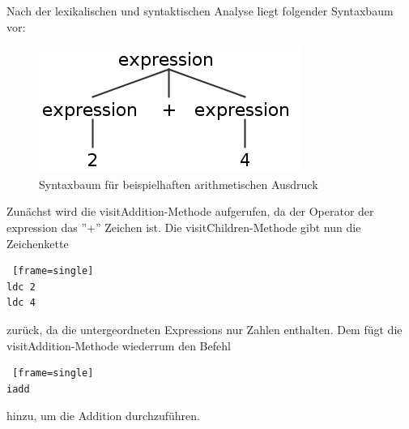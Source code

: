 \pagebreak
Nach der lexikalischen und syntaktischen Analyse liegt folgender Syntaxbaum vor:

\begin{figure}[h!]
\centering
\includegraphics[scale=0.4]{pics/antlr4_parse_tree_visitAdditionVisitNumberBeispiel.png}
\caption{Syntaxbaum für beispielhaften arithmetischen Ausdruck}
\end{figure}

Zunächst wird die visitAddition-Methode aufgerufen, da der Operator der expression das ''+'' Zeichen ist. Die visitChildren-Methode gibt nun die Zeichenkette
\begin{lstlisting} [frame=single]
ldc 2
ldc 4
\end{lstlisting}
zurück, da die untergeordneten Expressions nur Zahlen enthalten. Dem fügt die visitAddition-Methode wiederrum den Befehl
\begin{lstlisting} [frame=single]
iadd
\end{lstlisting}
hinzu, um die Addition durchzuführen.

